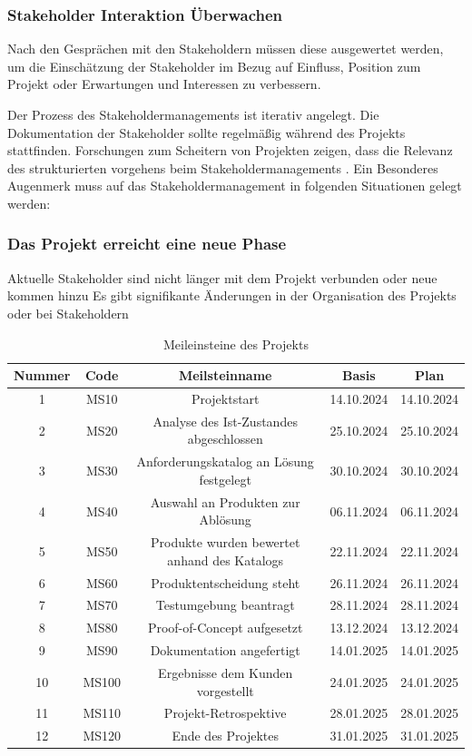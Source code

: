 \documentclass[ThesisDJ.tex]{subfiles}
\begin{document}
\subsubsection{Stakeholder Interaktion Überwachen}

Nach den Gesprächen mit den Stakeholdern müssen diese ausgewertet werden, um die Einschätzung der Stakeholder im Bezug auf Einfluss,
Position zum Projekt oder Erwartungen und Interessen zu verbessern.


Der Prozess des Stakeholdermanagements ist iterativ angelegt. Die Dokumentation der Stakeholder sollte regelmäßig während
des Projekts stattfinden. Forschungen zum Scheitern von Projekten zeigen, dass die Relevanz des strukturierten vorgehens 
beim Stakeholdermanagements \cite[S.~488]{project_management_institute_guide_2017}.
Ein Besonderes Augenmerk muss auf das Stakeholdermanagement in folgenden Situationen gelegt werden:

\subsubsection{Das Projekt erreicht eine neue Phase}
Aktuelle Stakeholder sind nicht länger mit dem Projekt verbunden oder neue kommen hinzu
Es gibt signifikante Änderungen in der Organisation des Projekts oder bei Stakeholdern


\begin{table}[h]
  \centering
\begin{tabular}{|c|c|c|c|c|}
  \hline
  Nummer & Code & Meilsteinname & Basis & Plan \\
  \hline
  1 & MS10 & Projektstart & 14.10.2024 & 14.10.2024 \\
  \hline
  2 & MS20 & Analyse des Ist-Zustandes abgeschlossen & 25.10.2024 & 25.10.2024 \\
  \hline
  3 & MS30 & Anforderungskatalog an Lösung festgelegt & 30.10.2024 & 30.10.2024 \\
  \hline
  4 & MS40 & Auswahl an Produkten zur Ablösung & 06.11.2024 & 06.11.2024 \\
  \hline
  5 & MS50 & Produkte wurden bewertet anhand des Katalogs & 22.11.2024 & 22.11.2024 \\
  \hline
  6 & MS60 & Produktentscheidung steht & 26.11.2024 & 26.11.2024 \\
  \hline
  7 & MS70 & Testumgebung beantragt & 28.11.2024 & 28.11.2024 \\
  \hline
  8 & MS80 & Proof-of-Concept aufgesetzt & 13.12.2024 & 13.12.2024 \\
  \hline
  9 & MS90 & Dokumentation angefertigt & 14.01.2025 & 14.01.2025 \\
  \hline
  10 & MS100 & Ergebnisse dem Kunden vorgestellt & 24.01.2025 & 24.01.2025 \\
  \hline
  11 & MS110 & Projekt-Retrospektive & 28.01.2025 & 28.01.2025 \\
  \hline
  12 & MS120 & Ende des Projektes & 31.01.2025 & 31.01.2025 \\
  \hline
\end{tabular}

\caption{Meileinsteine des Projekts}
\label{tab:milestones}

\end{table}
\end{document}
